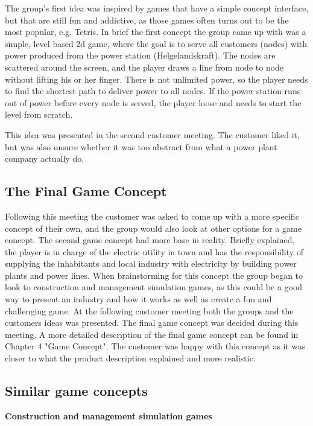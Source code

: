 The group's first idea was inspired by games that have a simple concept interface, but that are still fun and addictive, as those games often turns out to be the most popular, e.g. Tetris. In brief the first concept the group came up with was a simple, level based 2d game, where the goal is to serve all customers (nodes) with power produced from the power station
(Helgelandskraft). The nodes are scattered around the screen, and the player draws a line from node to node without lifting his or her finger. There is not unlimited power, so the player needs to find the shortest path to deliver
power to all nodes. If the power station runs out of power before every node is served, the player loose and needs to start the level from scratch.

This idea was presented in the second customer meeting. The customer liked it, but was also unsure whether it was too abstract from what a power plant company actually do. 

\subsection{The Final Game Concept}

Following this meeting the customer was asked to come up with a more specific concept of their own, and the group would also look at other options for a game concept. The second game concept had more base in reality. Briefly explained, the player is in charge of the electric utility in town and has the responsibility of supplying the inhabitants and local industry with electricity by building power plants and power lines. When brainstorming for this concept the group began to look to construction and management simulation games, as this could be a good way to present an industry and how it works as well as create a fun and challenging game. At the following customer meeting both the groups and the customers ideas was presented. The final game concept was decided during this meeting. A more detailed description of the final game concept can be found in Chapter 4 "Game Concept". The customer was happy with this concept as it was closer to what the product description explained and more realistic.

\subsection{Similar game concepts}

{\bf Construction and management simulation games}

